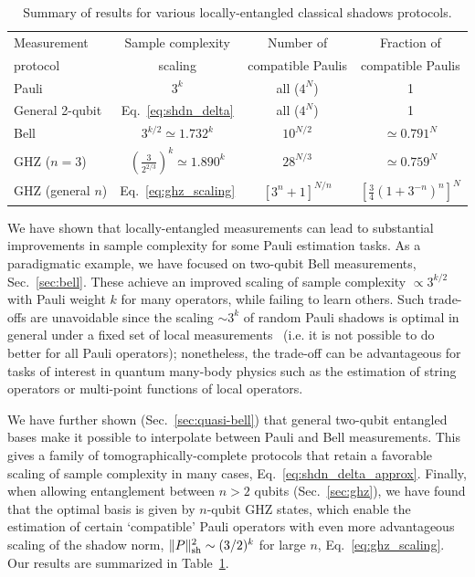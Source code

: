 \documentclass[a4paper,twocolumns,11pt,accepted=2024-03-04]{quantumarticle}
\newcommand{\shadownorm}[1]{\ensuremath{\| #1 \|_{\rm sh}}}
\begin{document}
\begin{table}
\centering
\begin{tabular}{lccc} \toprule
Measurement	& Sample complexity & Number of & Fraction of  \\ 
protocol	& scaling & compatible Paulis & compatible Paulis \\
\midrule
Pauli & $3^k$ & all ($4^N$) & 1 \\
General 2-qubit & Eq.~\eqref{eq:shdn_delta} & all ($4^N$) & 1 \\ 
Bell & $3^{k/2} \simeq 1.732^k$ & $10^{N/2}$ & $\simeq 0.791^N$ \\ 
GHZ ($n=3$) & $\left( \frac{3}{2^{2/3}} \right)^k \simeq 1.890^k$ & $28^{N/3}$ & $\simeq 0.759^N$ \\
GHZ (general $n$) & Eq.~\eqref{eq:ghz_scaling} & $[3^n+1]^{N/n}$ & $\left[ \frac{3}{4}(1+3^{-n})^n \right]^N$ \\ \bottomrule
\end{tabular}
\caption{Summary of results for various locally-entangled classical shadows protocols. \label{tab:summary}}
\end{table}

We have shown that locally-entangled measurements can lead to substantial improvements in sample complexity for some Pauli estimation tasks.
As a paradigmatic example, we have focused on two-qubit Bell measurements, Sec.~\ref{sec:bell}. These achieve an improved scaling of sample complexity $\propto 3^{k/2}$ with Pauli weight $k$ for many operators, while failing to learn others. Such trade-offs are unavoidable since the scaling $\sim 3^k$ of random Pauli shadows is optimal in general under a fixed set of local measurements~\cite{huang_predicting_2020} (i.e. it is not possible to do better for all Pauli operators);
nonetheless, the trade-off can be advantageous for tasks of interest in quantum many-body physics such as the estimation of string operators or multi-point functions of local operators.

We have further shown (Sec.~\ref{sec:quasi-bell}) that general two-qubit entangled bases make it possible to interpolate between Pauli and Bell measurements. This gives a family of tomographically-complete protocols that retain a favorable scaling of sample complexity in many cases, Eq.~\eqref{eq:shdn_delta_approx}. 
Finally, when allowing entanglement between $n>2$ qubits (Sec.~\ref{sec:ghz}), we have found that the optimal basis is given by $n$-qubit GHZ states, which enable the estimation of certain `compatible' Pauli operators with even more advantageous scaling of the shadow norm, $\shadownorm{P}^2\sim (3/2)^k$ for large $n$, Eq.~\eqref{eq:ghz_scaling}. 
Our results are summarized in Table~\ref{tab:summary}.
\end{document}
